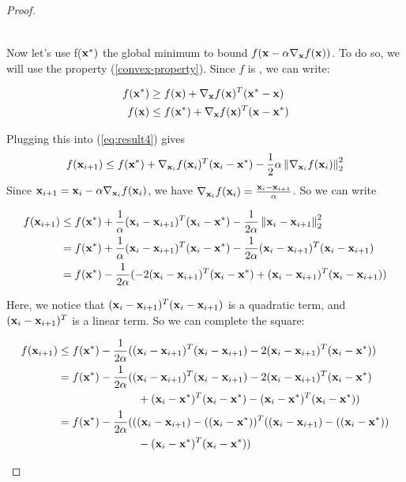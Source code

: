 \begin{proof}
\begin{ceqn}
\begin{align}
        \end{align}
    \end{ceqn}
    Now let's use f($\vx^*)$ the global minimum to bound $f(\vx - \alpha \nabla_\vx f(\vx))$. To do so, we will use the property (\ref{convex-property}). Since $f$ is \cvx, we can write:
    \begin{ceqn}
        \begin{align*}
            f(\vx^*) &\geq f(\vx) + \nabla_\vx f(\vx)^T(\vx^* - \vx) \\
            f(\vx) &\leq f(\vx^*) + \nabla_\vx f(\vx)^T(\vx - \vx^*)
        \end{align*}
    \end{ceqn}
    Plugging this into (\ref{eq:result4}) gives
    $$f(\vx_{i+1}) \leq f(\vx^*) + \nabla_{\vx_i} f(\vx_i)^T(\vx_i - \vx^*) - \frac{1}{2}\alpha \norm{\nabla_{\vx_i} f(\vx_i)}_2^2$$
    Since $\vx_{i+1} = \vx_i - \alpha \nabla_{\vx_i} f(\vx_i)$, we have $\nabla_{\vx_i} f(\vx_i) = \frac{\vx_i - \vx_{i+1}}{\alpha}$. So we can write
    \begin{ceqn}
        \begin{align*}
            f(\vx_{i+1}) &\leq f(\vx^*) + \frac{1}{\alpha}(\vx_i - \vx_{i+1})^T(\vx_i - \vx^*) - \frac{1}{2\alpha} \norm{\vx_i - \vx_{i+1}}_2^2 \\
            &= f(\vx^*) + \frac{1}{\alpha}(\vx_i - \vx_{i+1})^T(\vx_i - \vx^*) - \frac{1}{2\alpha} (\vx_i - \vx_{i+1})^T(\vx_i - \vx_{i+1}) \\
            &= f(\vx^*) - \frac{1}{2\alpha} (-2(\vx_i - \vx_{i+1})^T(\vx_i - \vx^*) + (\vx_i - \vx_{i+1})^T(\vx_i - \vx_{i+1}))
        \end{align*}
    \end{ceqn}
    Here, we notice that $(\vx_i - \vx_{i+1})^T(\vx_i - \vx_{i+1})$ is a quadratic term, and $(\vx_i - \vx_{i+1})^T$ is a linear term. So we can complete the square:
    \begin{ceqn}
        \begin{align*}
            f(\vx_{i+1}) &\leq f(\vx^*) - \frac{1}{2\alpha} ((\vx_i - \vx_{i+1})^T(\vx_i - \vx_{i+1}) -2(\vx_i - \vx_{i+1})^T(\vx_i - \vx^*)) \\
            &= f(\vx^*) - \frac{1}{2\alpha} ((\vx_i - \vx_{i+1})^T(\vx_i - \vx_{i+1}) -2(\vx_i - \vx_{i+1})^T(\vx_i - \vx^*) \\ & \hspace{1in} + (\vx_i - \vx^*)^T(\vx_i - \vx^*) - (\vx_i - \vx^*)^T(\vx_i - \vx^*)) \\
            &= f(\vx^*) - \frac{1}{2\alpha} (((\vx_i - \vx_{i+1}) -((\vx_i - \vx^*))^T ((\vx_i - \vx_{i+1}) -((\vx_i - \vx^*)) \\ & \hspace{1in} - (\vx_i - \vx^*)^T(\vx_i - \vx^*)) \\

\end{align*}
\end{ceqn}
\end{proof}
